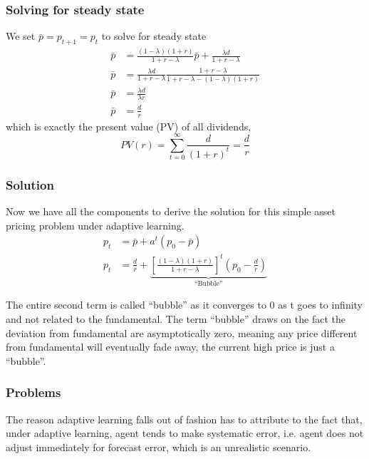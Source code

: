 \documentclass[twocolumn, fleqn]{article}
\begin{document}
			\subsubsection{Solving for steady state}
				We set $\bar{p} = p_{t+1}=p_t$ to solve for steady state
				\begin{align*}
						\bar{p} &= \frac{(1-\lambda)(1+r)}{1+r-\lambda} \bar{p} + \frac{\lambda d}{1+r-\lambda}\\
						\bar{p} &= \frac{\lambda d}{1+r-\lambda} \frac{1+r-\lambda}{1+r-\lambda - (1-\lambda)(1+r)}\\
						\bar{p} &=\frac{\lambda d}{\lambda r}\\[4pt]
						\bar{p} &=\frac{d}{r}
				\end{align*}
				which is exactly the present value (PV) of all dividends,
				\begin{equation*}
						PV(r) = \sum_{t=0}^{\infty} \frac{d}{(1+r)^t} = \frac{d}{r}
				\end{equation*}

			\subsubsection{Solution}
				Now we have all the components to derive the solution for this simple asset pricing problem under
				adaptive learning.
				\begin{align*}
						p_t & = \bar{p} + a^t (p_0-\bar{p})\\[4pt]
						p_t & = \frac{d}{r} +
						\underbrace{\left[\frac{(1-\lambda)(1+r)}{1+r-\lambda}\right]^t (p_0 -\frac{d}{r})}_{\text{``Bubble''}}
				\end{align*}

				The entire second term is called ``bubble'' as it converges to 0 as t goes to infinity and not
				related to the fundamental.
				The term ``bubble'' draws on the fact the deviation from fundamental are asymptotically zero,
				meaning any price different from fundamental will eventually fade away, the current high price is just a ``bubble''.

			\subsubsection{Problems}
				The reason adaptive learning falls out of fashion has to attribute to the fact that, under adaptive learning, agent tends to make systematic error, i.e. agent does not adjust immediately for forecast error, which is an unrealistic scenario.
\end{document}

